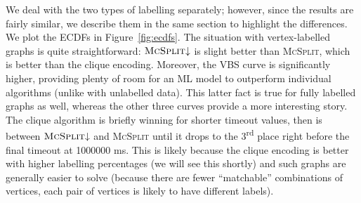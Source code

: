 \documentclass{l4proj}
\theoremstyle{definition}
\theoremstyle{remark}
\begin{document}
We deal with the two types of labelling separately; however, since the results
are fairly similar, we describe them in the same section to highlight the
differences. We plot the ECDFs in Figure~\ref{fig:ecdfs}. The situation with
vertex-labelled graphs is quite straightforward: $\textsc{McSplit}{\downarrow}$ is
slight better than \textsc{McSplit}, which is better than the clique encoding.
Moreover, the VBS curve is significantly higher, providing plenty of room for an
ML model to outperform individual algorithms (unlike with unlabelled data). This
latter fact is true for fully labelled graphs as well, whereas
the other three curves provide a more interesting story. The clique algorithm is
briefly winning for shorter timeout values, then is between
$\textsc{McSplit}{\downarrow}$ and \textsc{McSplit} until it drops to the
3\textsuperscript{rd} place right before the final timeout at \num{1000000} ms.
This is likely because the clique encoding is better with higher labelling
percentages (we will see this shortly) and such graphs are generally easier to
solve (because there are fewer ``matchable'' combinations of vertices, each pair
of vertices is likely to have different labels).
\end{document}
